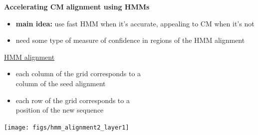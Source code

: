 \documentclass[landscape]{slides}
\begin{document}
\begin{slide}
\begin{center}
\large
\textbf{Accelerating CM alignment using HMMs}
\end{center}
\medskip
\begin{minipage}{6in}
\footnotesize
\begin{itemize}
\item
\textbf{main idea:} use fast HMM when it's accurate, appealing to CM when it's not
\item
need some type of measure of confidence in regions of the HMM alignment

\end{itemize}
\small
\hspace{0.3in}
\underline{HMM alignment}%
\begin{itemize}
\item
each column of the grid corresponds to a \\ column
of the seed alignment
\item
each row of the grid corresponds to a \\ position of the new sequence
\end{itemize}
\vspace{3in}
\end{minipage}
\begin{minipage}{4in}
\begin{center}
\texttt{[image: figs/hmm\_alignment2\_layer1]}
\end{center}
\vspace{1.5in}
\end{minipage}
\end{slide}
\end{document}
